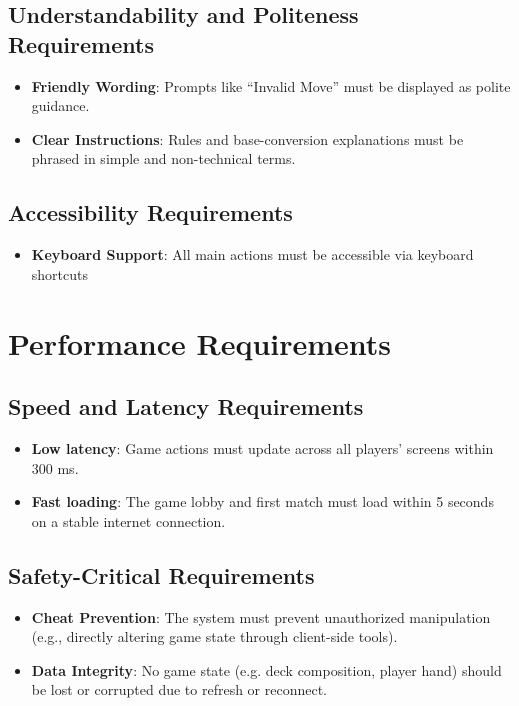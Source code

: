 \documentclass[12pt]{article}
\begin{document}
\subsection{Understandability and Politeness Requirements}
	\begin{itemize}
		\item \textbf{Friendly Wording}: Prompts like “Invalid Move” must be displayed as polite guidance.
		\item \textbf{Clear Instructions}: Rules and base-conversion explanations must be phrased in simple and non-technical terms.
	\end{itemize}
\subsection{Accessibility Requirements}
	\begin{itemize}
		\item\textbf{Keyboard Support}: All main actions must be accessible via keyboard shortcuts
	\end{itemize}

\section{Performance Requirements}
\subsection{Speed and Latency Requirements}
	\begin{itemize}
		\item\textbf{Low latency}: Game actions must update across all players’ screens within 300 ms.
		\item \textbf{Fast loading}: The game lobby and first match must load within 5 seconds on a stable internet connection.
	\end{itemize}

\subsection{Safety-Critical Requirements}
	\begin{itemize}
		\item\textbf{Cheat Prevention}: The system must prevent unauthorized manipulation (e.g., directly altering game state through client-side tools).
		\item \textbf{Data Integrity}: No game state (e.g. deck composition, player hand) should be lost or corrupted due to refresh or reconnect.
	\end{itemize}
\end{document}
